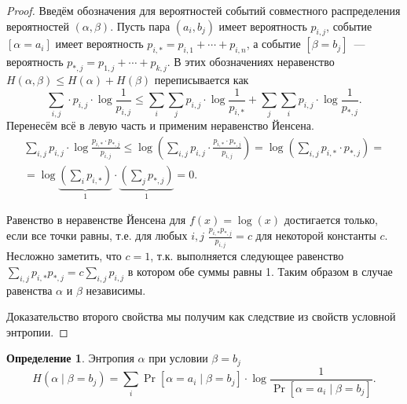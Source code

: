 \documentclass[12pt]{article}
\theoremstyle{definition}
\newtheorem{definition}{Определение}
\theoremstyle{plain}
\theoremstyle{remark}
\begin{document}
\begin{proof}
Введём обозначения для вероятностей событий совместного распределения вероятностей \((\alpha, \beta)\). Пусть пара \((a_i, b_j)\) имеет вероятность \(p_{i,j}\), событие \([\alpha=a_i]\) имеет вероятность \(p_{i,*} = p_{i,1} + \dotsb + p_{i,n}\), а событие 
\([\beta=b_j]\)~--- вероятность \(p_{*,j} = p_{1,j} + \dotsb + p_{k,j}\). В этих обозначениях неравенство \(H(\alpha, \beta) \le H(\alpha) + H(\beta)\) переписывается как
\[
\sum_{i,j}\cdot p_{i,j}\cdot \log\frac1{p_{i,j}} \le
\sum_{i}\sum_{j} p_{i,j}\cdot \log\frac1{p_{i,*}} +
\sum_{j}\sum_{i} p_{i,j}\cdot \log\frac1{p_{*,j}}.
\]
Перенесём всё в левую часть и применим неравенство Йенсена.
\begin{multline*}
\sum_{i,j}p_{i,j}\cdot \log\frac{p_{i,*}\cdot p_{*,j}}{p_{i,j}} \le
\log\left(\sum_{i,j}p_{i,j}\cdot \frac{p_{i,*}\cdot p_{*,j}}{p_{i,j}}\right) =
\log\left(\sum_{i,j}p_{i,*}\cdot p_{*,j}\right) = \\
= \log \underbrace{\left(\sum_{i}p_{i,*}\right)}_1\cdot
     \underbrace{\left(\sum_{j}p_{*,j}\right)}_1 = 0.
\end{multline*}

Равенство в неравенстве Йенсена для $f(x) = \log(x)$ достигается только, если все точки равны, т.е. 
для любых \(i,j\) \(\frac{p_{i,*}p_{*,j}}{p_{i,j}} = c\) для некоторой константы \(c\). Несложно заметить, что \(c =
1\), т.к. выполняется следующее равенство \(\sum_{i,j} {p_{i,*}p_{*,j}} = c \sum_{i,j}{p_{i,j}}\) в котором обе суммы
равны 1. Таким образом в случае равенства \(\alpha\) и \(\beta\) независимы.

Доказательство второго свойства мы получим как следствие из свойств условной энтропии.
\end{proof}

\begin{definition}\label{def:cond-entropy1}
Энтропия \(\alpha\) при условии \(\beta = b_j\)
\[H(\alpha\mid\beta = b_j) = \sum_i \Pr[\alpha = a_i\mid \beta = b_j]\cdot
    \log\frac{1}{\Pr[\alpha = a_i\mid \beta = b_j]}. \]
\end{definition}
\end{document}
